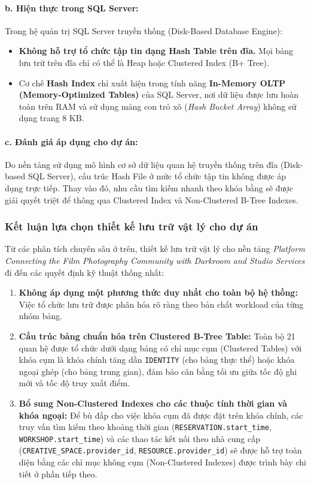 \paragraph{b. Hiện thực trong SQL Server:}
Trong hệ quản trị SQL Server truyền thống (Disk-Based Database Engine):
\begin{itemize}
    \item \textbf{Không hỗ trợ tổ chức tập tin dạng Hash Table trên đĩa.} Mọi bảng lưu trữ trên đĩa chỉ có thể là Heap hoặc Clustered Index (B+ Tree).
    \item Cơ chế \textbf{Hash Index} chỉ xuất hiện trong tính năng \textbf{In-Memory OLTP (Memory-Optimized Tables)} của SQL Server, nơi dữ liệu được lưu hoàn toàn trên RAM và sử dụng mảng con trỏ xô (\textit{Hash Bucket Array}) không sử dụng trang $8\text{ KB}$.
\end{itemize}

\paragraph{c. Đánh giá áp dụng cho dự án:}
Do nền tảng sử dụng mô hình cơ sở dữ liệu quan hệ truyền thống trên đĩa (Disk-based SQL Server), cấu trúc Hash File ở mức tổ chức tập tin không được áp dụng trực tiếp. Thay vào đó, nhu cầu tìm kiếm nhanh theo khóa bằng sẽ được giải quyết triệt để thông qua Clustered Index và Non-Clustered B-Tree Indexes.

\subsubsection{Kết luận lựa chọn thiết kế lưu trữ vật lý cho dự án}

Từ các phân tích chuyên sâu ở trên, thiết kế lưu trữ vật lý cho nền tảng \textit{Platform Connecting the Film Photography Community with Darkroom and Studio Services} đi đến các quyết định kỹ thuật thống nhất:

\begin{enumerate}
    \item \textbf{Không áp dụng một phương thức duy nhất cho toàn bộ hệ thống:} Việc tổ chức lưu trữ được phân hóa rõ ràng theo bản chất workload của từng nhóm bảng.
    \item \textbf{Cấu trúc bảng chuẩn hóa trên Clustered B-Tree Table:} Toàn bộ 21 quan hệ được tổ chức dưới dạng bảng có chỉ mục cụm (Clustered Tables) với khóa cụm là khóa chính tăng dần \texttt{IDENTITY} (cho bảng thực thể) hoặc khóa ngoại ghép (cho bảng trung gian), đảm bảo cân bằng tối ưu giữa tốc độ ghi mới và tốc độ truy xuất điểm.
    \item \textbf{Bổ sung Non-Clustered Indexes cho các thuộc tính thời gian và khóa ngoại:} Để bù đắp cho việc khóa cụm đã được đặt trên khóa chính, các truy vấn tìm kiếm theo khoảng thời gian (\texttt{RESERVATION.start\_time}, \texttt{WORKSHOP.start\_time}) và các thao tác kết nối theo nhà cung cấp (\texttt{CREATIVE\_SPACE.provider\_id}, \texttt{RESOURCE.provider\_id}) sẽ được hỗ trợ toàn diện bằng các chỉ mục không cụm (Non-Clustered Indexes) được trình bày chi tiết ở phần tiếp theo.
\end{enumerate}


